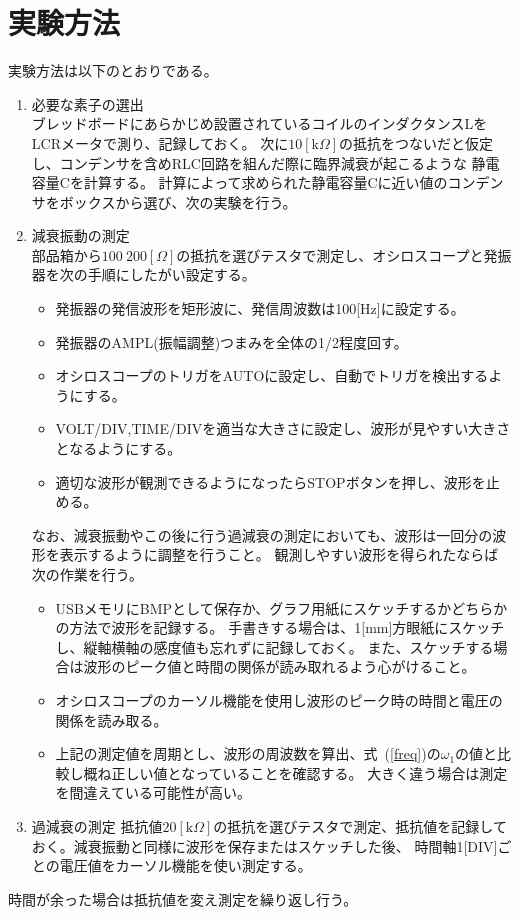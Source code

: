 \documentclass[a4j,10pt]{jarticle}
\newcommand{\Equref}[1]{式~(\ref{#1})}
\begin{document}
\section{実験方法}
実験方法は以下のとおりである。
\begin{enumerate}

\item 必要な素子の選出\\
ブレッドボードにあらかじめ設置されているコイルのインダクタンスLをLCRメータで測り、記録しておく。
次に$10[\mathrm k \Omega]$の抵抗をつないだと仮定し、コンデンサを含めRLC回路を組んだ際に臨界減衰が起こるような
静電容量Cを計算する。
計算によって求められた静電容量Cに近い値のコンデンサをボックスから選び、次の実験を行う。
\item 減衰振動の測定\\
部品箱から$100~200[\Omega]$の抵抗を選びテスタで測定し、オシロスコープと発振器を次の手順にしたがい設定する。


\begin{itemize}
\item 発振器の発信波形を矩形波に、発信周波数は100[Hz]に設定する。
\item 発振器のAMPL(振幅調整)つまみを全体の1/2程度回す。
\item オシロスコープのトリガをAUTOに設定し、自動でトリガを検出するようにする。
\item VOLT/DIV,TIME/DIVを適当な大きさに設定し、波形が見やすい大きさとなるようにする。
\item 適切な波形が観測できるようになったらSTOPボタンを押し、波形を止める。
\end{itemize}


なお、減衰振動やこの後に行う過減衰の測定においても、波形は一回分の波形を表示するように調整を行うこと。
観測しやすい波形を得られたならば次の作業を行う。
\begin{itemize}
\item USBメモリにBMPとして保存か、グラフ用紙にスケッチするかどちらかの方法で波形を記録する。
手書きする場合は、1[mm]方眼紙にスケッチし、縦軸横軸の感度値も忘れずに記録しておく。
また、スケッチする場合は波形のピーク値と時間の関係が読み取れるよう心がけること。
\item オシロスコープのカーソル機能を使用し波形のピーク時の時間と電圧の関係を読み取る。
\item 上記の測定値を周期とし、波形の周波数を算出、\Equref{freq}の$\omega_{1}$の値と比較し概ね正しい値となっていることを確認する。
		大きく違う場合は測定を間違えている可能性が高い。
\end{itemize}
\item 過減衰の測定
抵抗値$20[\mathrm k \Omega]$の抵抗を選びテスタで測定、抵抗値を記録しておく。減衰振動と同様に波形を保存またはスケッチした後、
時間軸1[DIV]ごとの電圧値をカーソル機能を使い測定する。
\end{enumerate}
時間が余った場合は抵抗値を変え測定を繰り返し行う。
\end{document}

